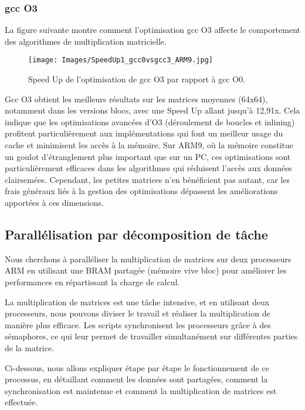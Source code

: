 \documentclass[../CSC_5RO06_TA.tex]{subfiles}
\begin{document}
\subsubsection{gcc O3}

La figure suivante montre comment l'optimisation gcc O3 affecte le comportement des algorithmes de multiplication matricielle.


\begin{figure}[H]
    \centering
    \texttt{[image: Images/SpeedUp1\_gcc0vsgcc3\_ARM9.jpg]}
    \caption{Speed Up de l'optimisation de gcc O3 par rapport à gcc O0.}
    \label{fig:7}
\end{figure}

Gcc O3 obtient les meilleurs résultats sur les matrices moyennes (64x64), notamment dans les versions blocs, avec une Speed Up allant jusqu'à 12,91x. Cela indique que les optimisations avancées d'O3 (déroulement de boucles et inlining) profitent particulièrement aux implémentations qui font un meilleur usage du cache et minimisent les accès à la mémoire. Sur ARM9, où la mémoire constitue un goulot d'étranglement plus important que sur un PC, ces optimisations sont particulièrement efficaces dans les algorithmes qui réduisent l'accès aux données clairsemées. Cependant, les petites matrices n'en bénéficient pas autant, car les frais généraux liés à la gestion des optimisations dépassent les améliorations apportées à ces dimensions.

\subsection{Parallélisation par décomposition de tâche}

Nous cherchons à paralléliser la multiplication de matrices sur deux processeurs ARM en utilisant une BRAM partagée (mémoire vive bloc) pour améliorer les performances en répartissant la charge de calcul. 

La multiplication de matrices est une tâche intensive, et en utilisant deux processeurs, nous pouvons diviser le travail et réaliser la multiplication de manière plus efficace. Les scripts synchronisent les processeurs grâce à des sémaphores, ce qui leur permet de travailler simultanément sur différentes parties de la matrice. 

Ci-dessous, nous allons expliquer étape par étape le fonctionnement de ce processus, en détaillant comment les données sont partagées, comment la synchronisation est maintenue et comment la multiplication de matrices est effectuée.
\\
\end{document}
